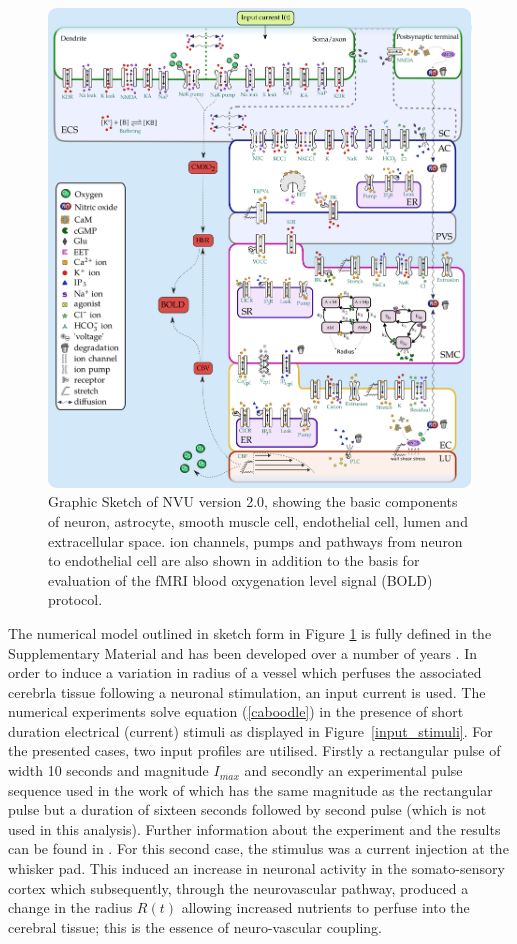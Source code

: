 \begin{figure}[h!]
\centering
\includegraphics[width=0.7\linewidth]{Figures/nvu_20}
\caption[Graphic Sketch of NVU version 2.0]{Graphic Sketch of NVU version 2.0, showing the basic components of neuron, astrocyte, smooth muscle cell, endothelial cell, lumen and extracellular space. ion channels, pumps and pathways from neuron to endothelial cell are also shown in addition to the basis for evaluation of the fMRI blood oxygenation level signal (BOLD) protocol.}
\label{fig:nvu20}
\end{figure}

  
  
The numerical model outlined in sketch form in Figure \ref{fig:nvu20} is fully defined in the Supplementary Material  and has been developed over a number of years \cite{Farr2011,Dormanns2015,Dormanns2016b}. 
In order to induce a variation in radius of a vessel which perfuses the associated cerebrla tissue following a neuronal stimulation, an input current is used. The numerical experiments solve equation (\ref{caboodle}) in the presence of short duration electrical (current) stimuli as displayed in Figure~\ref{input_stimuli}. For the presented cases, two input profiles are utilised. Firstly a rectangular pulse of width 10 seconds and magnitude  $I_{max}$ and secondly an experimental pulse sequence used in the work of \cite{Zheng2010} which has the same magnitude as the rectangular pulse but a duration of sixteen seconds followed by second pulse (which is not used in this analysis). Further information about the experiment and the results can be found in \cite{Zheng2010}.  For this second case, the stimulus was a current injection at the whisker pad. This induced an increase in neuronal activity in the somato-sensory cortex which subsequently, through the neurovascular pathway, produced a  change in the radius $R(t)$ allowing increased nutrients to perfuse into the cerebral tissue; this is  the essence of neuro-vascular coupling. 


